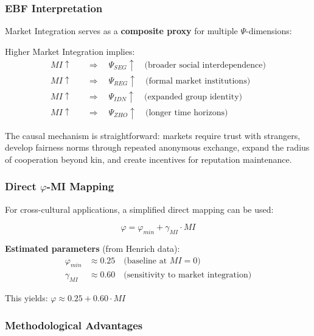 \subsubsection{EBF Interpretation}

Market Integration serves as a \textbf{composite proxy} for multiple $\Psi$-dimensions:

\begin{proposition}[MI Decomposition]
\label{prop:mi-decomposition}
Higher Market Integration implies:
\begin{align}
MI \uparrow \quad &\Rightarrow \quad \Psi_{SEG} \uparrow \quad \text{(broader social interdependence)} \\
MI \uparrow \quad &\Rightarrow \quad \Psi_{REG} \uparrow \quad \text{(formal market institutions)} \\
MI \uparrow \quad &\Rightarrow \quad \Psi_{IDN} \uparrow \quad \text{(expanded group identity)} \\
MI \uparrow \quad &\Rightarrow \quad \Psi_{ZHO} \uparrow \quad \text{(longer time horizons)}
\end{align}
\end{proposition}

The causal mechanism is straightforward: markets require trust with strangers, develop fairness norms through repeated anonymous exchange, expand the radius of cooperation beyond kin, and create incentives for reputation maintenance.

\subsubsection{Direct $\varphi$-MI Mapping}

For cross-cultural applications, a simplified direct mapping can be used:

\begin{equation}
\boxed{\varphi = \varphi_{min} + \gamma_{MI} \cdot MI}
\end{equation}

\textbf{Estimated parameters} (from Henrich data):
\begin{align}
\varphi_{min} &\approx 0.25 \quad \text{(baseline at } MI = 0\text{)} \\
\gamma_{MI} &\approx 0.60 \quad \text{(sensitivity to market integration)}
\end{align}

This yields: $\varphi \approx 0.25 + 0.60 \cdot MI$

\subsubsection{Methodological Advantages}

